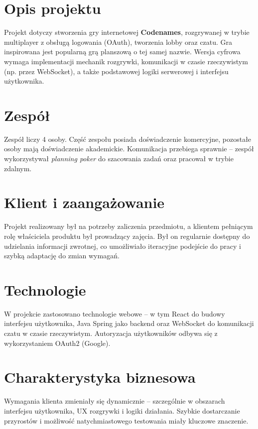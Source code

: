 \documentclass[12pt,a4paper,colorlinks=true,linkcolor=NavyBlue,citecolor=red,urlcolor=NavyBlue]{book}
\begin{document}
\section{Opis projektu}
Projekt dotyczy stworzenia gry internetowej \textbf{Codenames}, rozgrywanej w trybie multiplayer z obsługą logowania (OAuth), tworzenia lobby oraz czatu. Gra inspirowana jest popularną grą planszową o tej samej nazwie. Wersja cyfrowa wymaga implementacji mechanik rozgrywki, komunikacji w czasie rzeczywistym (np. przez WebSocket), a także podstawowej logiki serwerowej i interfejsu użytkownika.

\section{Zespół}
Zespół liczy 4 osoby. Część zespołu posiada doświadczenie komercyjne, pozostałe osoby mają doświadczenie akademickie. Komunikacja przebiega sprawnie – zespół wykorzystywał \textit{planning poker} do szacowania zadań oraz pracował w trybie zdalnym. 

\section{Klient i zaangażowanie}
Projekt realizowany był na potrzeby zaliczenia przedmiotu, a klientem pełniącym rolę właściciela produktu był prowadzący zajęcia. Był on regularnie dostępny do udzielania informacji zwrotnej, co umożliwiało iteracyjne podejście do pracy i szybką adaptację do zmian wymagań.

\section{Technologie}
W projekcie zastosowano technologie webowe – w tym React do budowy interfejsu użytkownika, Java Spring jako backend oraz WebSocket do komunikacji czatu w czasie rzeczywistym. Autoryzacja użytkowników odbywa się z wykorzystaniem OAuth2 (Google).

\section{Charakterystyka biznesowa}
Wymagania klienta zmieniały się dynamicznie – szczególnie w obszarach interfejsu użytkownika, UX rozgrywki i logiki działania. Szybkie dostarczanie przyrostów i możliwość natychmiastowego testowania miały kluczowe znaczenie.


\newpage
\thispagestyle{empty}
\null
\newpage
\end{document}
